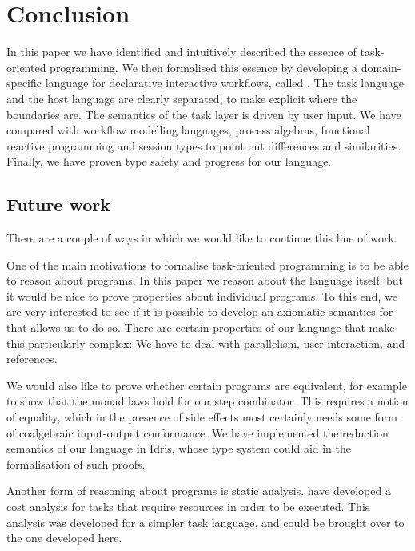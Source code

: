 
\section{Conclusion}

\label{sec:conclusions}

In this paper we have identified and intuitively described the essence of task-oriented programming.
We then formalised this essence by developing a domain-specific language for declarative interactive workflows, called \TOPHAT.
The task language and the host language are clearly separated, to make explicit where the boundaries are.
The semantics of the task layer is driven by user input.
We have compared \TOPHAT with workflow modelling languages, process algebras, functional reactive programming and session types to point out differences and similarities.
Finally, we have proven type safety and progress for our language.

\subsection{Future work}

There are a couple of ways in which we would like to continue this line of work.

One of the main motivations to formalise task-oriented programming is to be able to reason about programs.
In this paper we reason about the language itself, but it would be nice to prove properties about individual programs.
To this end, we are very interested to see if it is possible to develop an axiomatic semantics for \TOPHAT that allows us to do so.
There are certain properties of our language that make this particularly complex:
We have to deal with parallelism, user interaction, and references.

We would also like to prove whether certain programs are equivalent, for example to show that the monad laws hold for our step combinator.
This requires a notion of equality, which in the presence of side effects most certainly needs some form of coalgebraic input-output conformance.
We have implemented the reduction semantics of our language in Idris, whose type system could aid in the formalisation of such proofs.

Another form of reasoning about programs is static analysis.
\citet{conf/ifl/KlinikJP17} have developed a cost analysis for tasks that require resources in order to be executed.
This analysis was developed for a simpler task language, and could be brought over to the one developed here.

